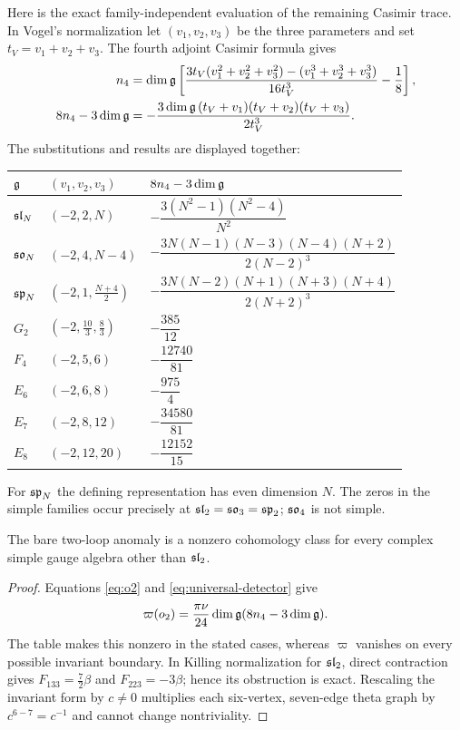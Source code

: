 Here is the exact family-independent evaluation of the remaining
Casimir trace. In Vogel's normalization let
$(v_1,v_2,v_3)$ be the three parameters and set
$t_V=v_1+v_2+v_3$. The fourth adjoint Casimir formula
\cite{MSV} gives
\begin{align}
 n_4&=\dim\mathfrak g\left[
  \frac{3t_V(v_1^2+v_2^2+v_3^2)
              -(v_1^3+v_2^3+v_3^3)}
       {16t_V^3}-\frac18\right],\notag\\
 8n_4-3\dim\mathfrak g
 &=-\frac{3\dim\mathfrak g\,(t_V+v_1)(t_V+v_2)(t_V+v_3)}
             {2t_V^3}.
 \label{eq:vogel-detector}
\end{align}
The substitutions and results are displayed together:
\begin{center}
\renewcommand{\arraystretch}{1.55}
\begin{tabular}{@{}lll@{}}
\toprule
$\mathfrak g$ & $(v_1,v_2,v_3)$ & $8n_4-3\dim\mathfrak g$\\
\midrule
$\mathfrak{sl}_N$ & $(-2,2,N)$
  & $-\dfrac{3(N^2-1)(N^2-4)}{N^2}$\\
\addlinespace[3pt]
$\mathfrak{so}_N$ & $(-2,4,N-4)$
  & $-\dfrac{3N(N-1)(N-3)(N-4)(N+2)}{2(N-2)^3}$\\
\addlinespace[3pt]
$\mathfrak{sp}_N$ & $(-2,1,\frac{N+4}{2})$
  & $-\dfrac{3N(N-2)(N+1)(N+3)(N+4)}{2(N+2)^3}$\\
\addlinespace[3pt]
$G_2$ & $(-2,\frac{10}{3},\frac83)$ & $-\dfrac{385}{12}$\\
\addlinespace[3pt]
$F_4$ & $(-2,5,6)$ & $-\dfrac{12740}{81}$\\
\addlinespace[3pt]
$E_6$ & $(-2,6,8)$ & $-\dfrac{975}{4}$\\
\addlinespace[3pt]
$E_7$ & $(-2,8,12)$ & $-\dfrac{34580}{81}$\\
\addlinespace[3pt]
$E_8$ & $(-2,12,20)$ & $-\dfrac{12152}{15}$\\
\bottomrule
\end{tabular}
\end{center}
For $\mathfrak{sp}_N$ the defining representation has even dimension $N$.
The zeros in the simple families occur precisely at
$\mathfrak{sl}_2=\mathfrak{so}_3=\mathfrak{sp}_2$; $\mathfrak{so}_4$ is not simple.

\begin{theorem}
\label{thm:bare-anomaly}
The bare two-loop anomaly is a nonzero cohomology class for every
complex simple gauge algebra other than $\mathfrak{sl}_2$.
\end{theorem}
\begin{proof}
Equations \eqref{eq:o2} and \eqref{eq:universal-detector} give
\[
 \varpi(o_2)=\frac{\pi\nu}{24}
                 \dim\mathfrak g(8n_4-3\dim\mathfrak g).
\]
The table makes this nonzero in the stated cases, whereas
$\varpi$ vanishes on every possible invariant boundary.
In Killing normalization for $\mathfrak{sl}_2$, direct contraction gives
$F_{133}=\frac72\beta$ and $F_{223}=-3\beta$; hence its
obstruction is exact. Rescaling the invariant form by $c\ne0$
multiplies each six-vertex, seven-edge theta graph by
$c^{6-7}=c^{-1}$ and cannot change nontriviality.
\end{proof}
